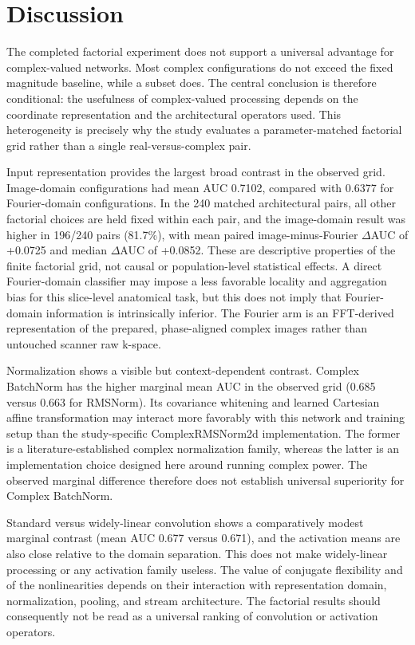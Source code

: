 \section{Discussion}\label{sec:discussion}
The completed factorial experiment does not support a universal advantage for complex-valued networks. Most complex configurations do not exceed the fixed magnitude baseline, while a subset does. The central conclusion is therefore conditional: the usefulness of complex-valued processing depends on the coordinate representation and the architectural operators used. This heterogeneity is precisely why the study evaluates a parameter-matched factorial grid rather than a single real-versus-complex pair.

Input representation provides the largest broad contrast in the observed grid. Image-domain configurations had mean AUC 0.7102, compared with 0.6377 for Fourier-domain configurations. In the 240 matched architectural pairs, all other factorial choices are held fixed within each pair, and the image-domain result was higher in 196/240 pairs (81.7\%), with mean paired image-minus-Fourier $\Delta$AUC of +0.0725 and median $\Delta$AUC of +0.0852. These are descriptive properties of the finite factorial grid, not causal or population-level statistical effects. A direct Fourier-domain classifier may impose a less favorable locality and aggregation bias for this slice-level anatomical task, but this does not imply that Fourier-domain information is intrinsically inferior. The Fourier arm is an FFT-derived representation of the prepared, phase-aligned complex images rather than untouched scanner raw k-space.

Normalization shows a visible but context-dependent contrast. Complex BatchNorm has the higher marginal mean AUC in the observed grid (0.685 versus 0.663 for RMSNorm). Its covariance whitening and learned Cartesian affine transformation may interact more favorably with this network and training setup than the study-specific ComplexRMSNorm2d implementation. The former is a literature-established complex normalization family, whereas the latter is an implementation choice designed here around running complex power. The observed marginal difference therefore does not establish universal superiority for Complex BatchNorm.

Standard versus widely-linear convolution shows a comparatively modest marginal contrast (mean AUC 0.677 versus 0.671), and the activation means are also close relative to the domain separation. This does not make widely-linear processing or any activation family useless. The value of conjugate flexibility and of the nonlinearities depends on their interaction with representation domain, normalization, pooling, and stream architecture. The factorial results should consequently not be read as a universal ranking of convolution or activation operators.

